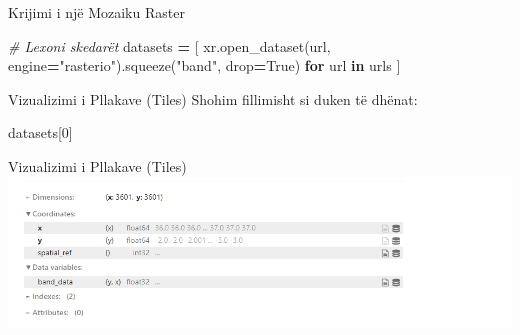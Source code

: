 \documentclass[
  ignorenonframetext,
]{beamer}
\newenvironment{Shaded}{\begin{snugshade}}{\end{snugshade}}
\newcommand{\CommentTok}[1]{\textcolor[rgb]{0.56,0.35,0.01}{\textit{#1}}}
\newcommand{\ControlFlowTok}[1]{\textcolor[rgb]{0.13,0.29,0.53}{\textbf{#1}}}
\newcommand{\DecValTok}[1]{\textcolor[rgb]{0.00,0.00,0.81}{#1}}
\newcommand{\KeywordTok}[1]{\textcolor[rgb]{0.13,0.29,0.53}{\textbf{#1}}}
\newcommand{\NormalTok}[1]{#1}
\newcommand{\OperatorTok}[1]{\textcolor[rgb]{0.81,0.36,0.00}{\textbf{#1}}}
\newcommand{\StringTok}[1]{\textcolor[rgb]{0.31,0.60,0.02}{#1}}
\newcommand{\VariableTok}[1]{\textcolor[rgb]{0.00,0.00,0.00}{#1}}
\begin{document}
\begin{frame}[fragile]{Krijimi i një Mozaiku Raster}
\protect\hypertarget{krijimi-i-njuxeb-mozaiku-raster-2}{}

\begin{Shaded}
\begin{Highlighting}[]
\CommentTok{\# Lexoni skedarët}
\NormalTok{datasets }\OperatorTok{=}\NormalTok{ [}
\NormalTok{    xr.open\_dataset(url, engine}\OperatorTok{=}\StringTok{"rasterio"}\NormalTok{).squeeze(}\StringTok{"band"}\NormalTok{, drop}\OperatorTok{=}\VariableTok{True}\NormalTok{) }\ControlFlowTok{for}\NormalTok{ url }\KeywordTok{in}\NormalTok{ urls}
\NormalTok{]}
\end{Highlighting}
\end{Shaded}
\end{frame}

\begin{frame}[fragile]{Vizualizimi i Pllakave (Tiles)}
\protect\hypertarget{vizualizimi-i-pllakave-tiles}{}
Shohim fillimisht si duken të dhënat:

\begin{Shaded}
\begin{Highlighting}[]
\NormalTok{datasets[}\DecValTok{0}\NormalTok{]}
\end{Highlighting}
\end{Shaded}
\end{frame}

\begin{frame}{Vizualizimi i Pllakave (Tiles)}
\protect\hypertarget{vizualizimi-i-pllakave-tiles-1}{}
\includegraphics{./Figs/tiless.png}
\end{frame}
\end{document}
